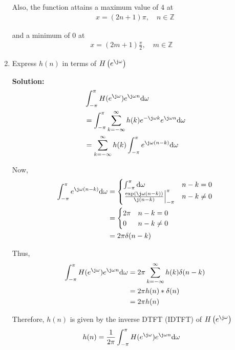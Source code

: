\documentclass[journal,12pt,twocolumn]{IEEEtran}
\newcommand{\solution}{\noindent \textbf{Solution: }}
\providecommand{\brak}[1]{\ensuremath{\left(#1\right)}}
\providecommand{\der}[1]{\mathrm{d} #1}
\numberwithin{equation}{section}
\renewcommand\thesection{\arabic{section}}
\begin{document}
\begin{enumerate}[label=\thesection.\arabic*]
	Also, the function attains a maximum value of $4$ at 
	\begin{align}
		x = (2n + 1)\pi, \quad n \in \mathbb{Z}
	\end{align} 
	
	and a minimum of $0$ at 
	\begin{align} 
		x = \brak{2m + 1}\frac{\pi}{2}, \quad m \in \mathbb{Z}\quad 
	\end{align}
	
	\item Express $h(n)$ in terms of $H\brak{e^{\j\omega}}$	
	
	\solution 
	\begin{align}
		&\int_{-\pi}^{\pi} H(e^{\j\omega}) e^{\j\omega n} \der{\omega} \\
		&= \int_{-\pi}^{\pi} \sum_{k=-\infty}^\infty h(k)  e^{-\j\omega k} e^{\j\omega n} \der{\omega} \\
		&= \sum_{k=-\infty}^\infty h(k) \int_{-\pi}^{\pi} e^{\j\omega(n-k)} \der{\omega}
	\end{align}
	
	Now,
	\begin{align}
		 \int_{-\pi}^{\pi} e^{\j\omega(n-k)} \der{\omega} 
		 &= \begin{cases}
		 	\int_{-\pi}^\pi \der{\omega} & n-k = 0 \\
		 	\left.\frac{\exp\brak{\j\omega(n-k)}}{\j(n-k)}\right|_{-\pi}^\pi & n-k \ne 0
		 \end{cases} \\		 
		 &= \begin{cases}
		 	2\pi & n-k = 0 \\
		 	0 & n-k \ne 0
		 \end{cases} \\
		 &= 2\pi \delta(n-k)
	\end{align}
	
	Thus,
	\begin{align}
		\int_{-\pi}^{\pi} H(e^{\j\omega}) e^{\j\omega n} \der{\omega} &= 2\pi\sum_{k=-\infty}^\infty h(k) \delta(n-k) \\
		&= 2\pi h(n) * \delta(n) \\
		&= 2\pi h(n)
	\end{align}
	
	Therefore, $h(n)$ is given by the inverse DTFT (IDTFT) of $H\brak{e^{\j\omega}}$
	\begin{align}
		h(n) &= \frac{1}{2\pi} \int_{-\pi}^{\pi} H(e^{\j\omega}) e^{\j\omega n} \der{\omega} 
	\end{align}
	
	\end{enumerate}
	
\end{document}
